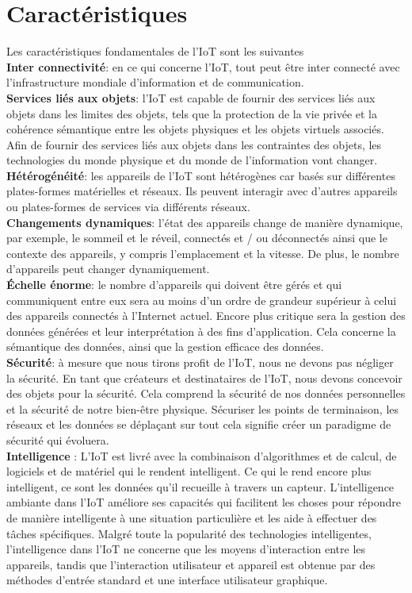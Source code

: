 	\section{Caractéristiques}
	Les caractéristiques fondamentales de l'IoT sont les suivantes \cite{patel2016iot}\cite{vermesan2014iot}\\
	\textbf{Inter connectivité}: en ce qui concerne l'IoT, tout peut être inter connecté avec l'infrastructure mondiale d'information et de communication.\\
	\textbf{Services liés aux objets}: l'IoT est capable de fournir des services liés aux objets dans les limites des objets, tels que la protection de la vie privée et la cohérence sémantique entre les objets physiques et les objets virtuels associés. Af{\kern0pt}in de fournir des services liés aux objets dans les contraintes des objets, les technologies du monde physique et du monde de l'information vont changer.\\
	\textbf{Hétérogénéité}: les appareils de l'IoT sont hétérogènes car basés sur dif{\kern0pt}férentes  plates-formes matérielles et réseaux. Ils peuvent interagir avec d'autres appareils ou plates-formes de services via dif{\kern0pt}férents réseaux.\\
\textbf{Changements dynamiques}: l'état des appareils change de manière dynamique, par exemple, le sommeil et le réveil, connectés et / ou déconnectés ainsi que le contexte des appareils, y compris l'emplacement et la vitesse. De plus, le nombre d'appareils peut changer dynamiquement.\\
	\textbf{Échelle énorme}: le nombre d'appareils qui doivent être gérés et qui communiquent entre eux sera au moins d'un ordre de grandeur supérieur à celui des appareils connectés à l'Internet actuel. Encore plus critique sera la gestion des données générées et leur interprétation à des f{\kern0pt}ins d'application. Cela concerne la sémantique des données, ainsi que la gestion ef{\kern0pt}f{\kern0pt}icace des données.\\
	\textbf{Sécurité}: à mesure que nous tirons profit de l'IoT, nous ne devons pas négliger la sécurité. En tant que créateurs et destinataires de l'IoT, nous devons concevoir des objets pour la sécurité. Cela comprend la sécurité de nos données personnelles et la sécurité de notre bien-être physique. Sécuriser les points de terminaison, les réseaux et les données se déplaçant sur tout cela signif{\kern0pt}ie créer un paradigme de sécurité qui évoluera.\\
	\textbf{Intelligence} : L'IoT est livré avec la combinaison d'algorithmes et de calcul, de logiciels et de matériel qui le rendent intelligent. Ce qui le rend encore plus intelligent, ce sont les données qu’il recueille à travers un capteur. L'intelligence ambiante dans l'IoT améliore ses capacités qui facilitent les choses pour répondre de manière intelligente à une situation particulière et les aide à ef{\kern0pt}fectuer des tâches spécif{\kern0pt}iques. Malgré toute la popularité des technologies intelligentes, l'intelligence dans l'IoT ne concerne que les moyens d'interaction entre les appareils, tandis que l'interaction utilisateur et appareil est obtenue par des méthodes d'entrée standard et une interface utilisateur graphique.\\
